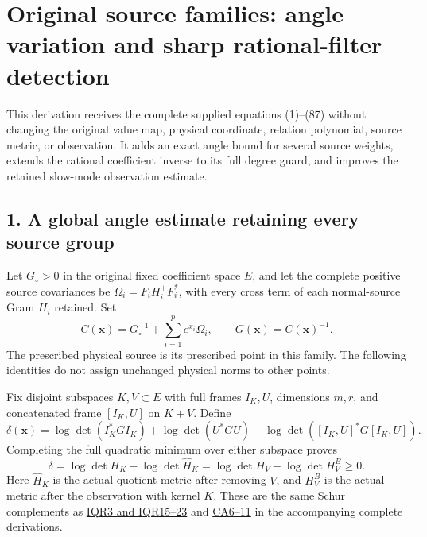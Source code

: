 \documentclass[11pt]{article}
\begin{document}
\section{Original source families: angle variation and sharp rational-filter detection}\label{original-source-families-angle-variation-and-sharp-rational-filter-detection}

This derivation receives the complete supplied equations (1)--(87) without changing the original value map, physical coordinate, relation polynomial, source metric, or observation. It adds an exact angle bound for several source weights, extends the rational coefficient inverse to its full degree guard, and improves the retained slow-mode observation estimate.

\subsection{1. A global angle estimate retaining every source group}\label{a-global-angle-estimate-retaining-every-source-group}

Let \(G_\circ>0\) in the original fixed coefficient space \(E\), and let the complete positive source covariances be \(\Omega_i=F_iH_i^+F_i^*\), with every cross term of each normal-source Gram \(H_i\) retained. Set \[
C(\mathbf x)=G_\circ^{-1}+\sum_{i=1}^p e^{x_i}\Omega_i,\qquad
G(\mathbf x)=C(\mathbf x)^{-1}.                                      \tag{UFR1}
\] The prescribed physical source is its prescribed point in this family. The following identities do not assign unchanged physical norms to other points.

Fix disjoint subspaces \(K,V\subset E\) with full frames \(I_K,U\), dimensions \(m,r\), and concatenated frame \([I_K,U]\) on \(K+V\). Define \[
\delta(\mathbf x)=
\log\det(I_K^*GI_K)+\log\det(U^*GU)
-\log\det([I_K,U]^*G[I_K,U]).                                      \tag{UFR2}
\] Completing the full quadratic minimum over either subspace proves \[
\delta=\log\det H_K-\log\det\widehat H_K
       =\log\det H_V-\log\det H_V^B\ge0.                           \tag{UFR3}
\] Here \(\widehat H_K\) is the actual quotient metric after removing \(V\), and \(H_V^B\) is the actual metric after the observation with kernel \(K\). These are the same Schur complements as \href{https://github.com/KokunoYumeto/zeta-function-research-reader/blob/ab120cf974feb26a31d77b07458b6da52f912ea4/workbenches/splitzero-tandem/continuations/20260921-inverse-quotient/INVERSE_QUOTIENT_RECEIVERS.tex}{IQR3 and IQR15--23} and \href{https://github.com/KokunoYumeto/zeta-function-research-reader/blob/ab120cf974feb26a31d77b07458b6da52f912ea4/workbenches/splitzero-tandem/continuations/20260921-inverse-quotient/INDEPENDENT_COVARIANCE_ANGLE.md}{CA6--11} in the accompanying complete derivations.
\end{document}
